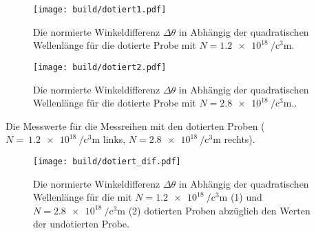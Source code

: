 \begin{figure}
	\centering
	\texttt{[image: build/dotiert1.pdf]}
	\caption{Die normierte Winkeldifferenz $\Delta\theta$ in Abhängig der quadratischen Wellenlänge für die dotierte Probe mit $N=\SI{1.2e18}{\per\cubic\centi\metre}$.}
	\label{fig:undot}
\end{figure}

\begin{figure}
	\centering
	\texttt{[image: build/dotiert2.pdf]}
	\caption{Die normierte Winkeldifferenz $\Delta\theta$ in Abhängig der quadratischen Wellenlänge für die dotierte Probe mit $N=\SI{2.8e18}{\per\cubic\centi\metre}$..}
	\label{fig:undot}
\end{figure}

\begin{table}
	\centering
	\caption{Die Messwerte für die Messreihen mit den dotierten Proben ($N=~\SI{1.2e18}{\per\cubic\centi\metre}$ links, $N=\SI{2.8e18}{\per\cubic\centi\metre}$ rechts).}
	
	
	\label{tab:undot}
\end{table}

\begin{figure}
	\centering
	\texttt{[image: build/dotiert\_dif.pdf]}
	\caption{Die normierte Winkeldifferenz $\Delta\theta$ in Abhängig der quadratischen Wellenlänge für die mit $N=\SI{1.2e18}{\per\cubic\centi\metre}$ (1) und $N=\SI{2.8e18}{\per\cubic\centi\metre}$ (2) dotierten Proben abzüglich den Werten der undotierten Probe.}
	\label{fig:undot}
\end{figure}
